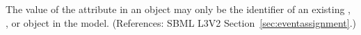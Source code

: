 The value of the attribute  in an \EventAssignment object
may only be the identifier of an existing \Compartment, \Species,
\Parameter or \SpeciesReference object in the model.  (References: SBML
L3V2 Section~\ref{sec:eventassignment}.)
